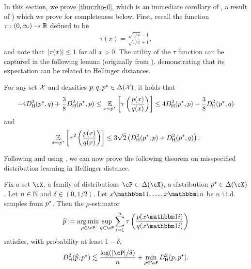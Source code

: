 
In this section, we prove \cref{thm:rho-il}, which is an immediate
corollary of , a result of \citet{baraud2018rho}) which we prove for completeness below.%
First, recall the function $\tau: (0,\infty) \to \mathbb{R}$ defined to be
\begin{align}
  \tau(x) = \frac{\sqrt{1/x} - 1}{\sqrt{1/x} + 1},
\end{align}
and note that $\left\lvert\tau(x)\right\rvert \leq 1$ for all $x > 0$.  The utility of
the $\tau$ function can be captured in the following lemma (originally
from \citet{baraud2018rho}), demonstrating that its expectation can be related to Hellinger distances.
\begin{lemma}\label{lemma:rho-estimator-bounds}
For any set $\mathcal{X}$ and densities $p,q,p^\star \in \Delta(\mathcal{X})$, it holds that
\begin{equation} -4\Dhels{\pstar}{q} + \frac{3}{8} \Dhels{\pstar}{p} \leq \EE_{x \sim \pstar}\left[\tau\left(\frac{p(x)}{q(x)}\right)\right] \leq 4\Dhels{\pstar}{p} - \frac{3}{8} \Dhels{\pstar}{q}
\label{eq:tau-hels}
\end{equation}
and
\begin{equation}
\EE_{x \sim \pstar}\left[\tau^2\left(\frac{p(x)}{q(x)}\right)\right] \leq 3\sqrt{2}\left(\Dhels{p^\st}{p} + \Dhels{p^\st}{q}\right).
\label{eq:tau-sq-hels}
\end{equation}
\end{lemma}
Following \citet{baraud2018rho,lerasle2019lecture} and using , we can now prove the following theorem on misspecified distribution learning in Hellinger distance.
\begin{theorem}\label{thm:rho}
Fix a set $\cX$, a family of distributions $\cP \subset \Delta(\cX)$, a distribution $p^\st \in \Delta(\cX)$. Let $n \in \mathbb{N}$ and $\delta \in (0,1/2)$. Let $x\ind{1},\dots,x\ind{n}$ be $n$ i.i.d. samples from $p^\star$. Then the $\rho$-estimator 
\[\phat := \argmin_{p \in \cP} \sup_{q \in \cP} 
\sum_{i=1}^n \tau\left(\frac{p(x\ind{i})}{q(x\ind{i})}
\right)\]
satisfies, with probability at least $1-\delta$,
\begin{equation} \Dhels{\phat}{p^\st} \lesssim \frac{\log(|\cP|/\delta)}{n} + \min_{p\in\cP} \Dhels{p}{p^\st}.
\label{eq:rho-thm}\end{equation}
\end{theorem}

